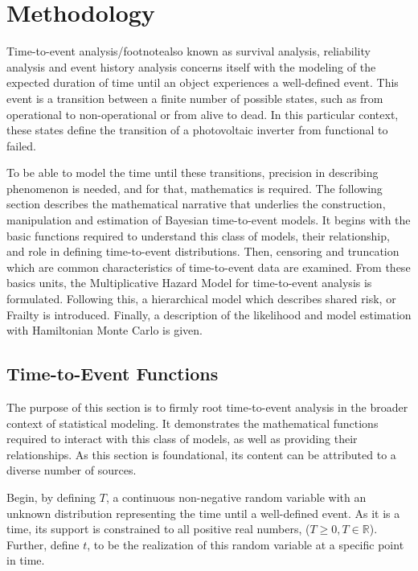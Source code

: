 \chapter*{Methodology}

Time-to-event analysis/footnote{also known as survival analysis, reliability analysis and event history analysis} concerns itself with the modeling of the expected duration of time until an object experiences a well-defined event. This event is a transition between a finite number of possible states, such as from operational to non-operational or from alive to dead\cite{Andersen1992}. In this particular context, these states define the transition of a photovoltaic inverter from functional to failed.

To be able to model the time until these transitions, precision in describing phenomenon is needed, and for that, mathematics is required. The following section describes the mathematical narrative that underlies the construction, manipulation and estimation of Bayesian time-to-event models. It begins with the basic functions required to understand this class of models, their relationship, and role in defining time-to-event distributions. Then, censoring and truncation which are common characteristics of time-to-event data are examined. From these basics units, the Multiplicative Hazard Model for time-to-event analysis is formulated. Following this, a hierarchical model which describes shared risk, or Frailty is introduced. Finally, a description of the likelihood and model estimation with Hamiltonian Monte Carlo is given.



\section*{Time-to-Event Functions}

The purpose of this section is to firmly root time-to-event analysis in the broader context of statistical modeling. It demonstrates the mathematical functions required to interact with this class of models, as well as providing their relationships. As this section is foundational, its content can be attributed to a diverse number of sources\cite{Aalen2008}\cite{Tableman2004}\cite{Klein2003}\cite{Kleinbaum2005}\cite{Cleves2008}\cite{Rodriguez2007}.

Begin, by defining $T$, a continuous non-negative random variable with an unknown distribution representing the time until a well-defined event. As it is a time, its support is constrained to all positive real numbers, ($T \ge 0, T \in \mathbb{R}$). Further, define $t$, to be the realization of this random variable at a specific point in time.

